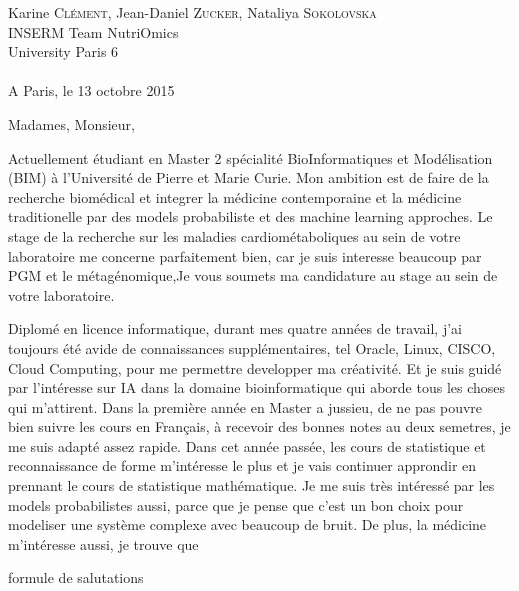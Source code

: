 \documentclass[11pt]{lettre}
\begin{document}
\begin{letter}{Karine \textsc{Clément}, Jean-Daniel \textsc{Zucker}, Nataliya \textsc{Sokolovska} \\ INSERM Team NutriOmics \\University Paris 6 \\ \\ A Paris, le 13 octobre 2015}
\address{\textsc{WANG} Jinxin\\ 82 Boulevard Saint Germain\\ 75005 Paris }

\def\concname{Object : } 

\opening{Madames, Monsieur,}

Actuellement étudiant en Master 2 spécialité BioInformatiques et Modélisation (BIM) à l'Université de Pierre et Marie Curie. 
Mon ambition est de faire de la recherche biomédical et integrer la médicine contemporaine et la médicine traditionelle par 
des models probabiliste et des machine learning approches. Le stage de la recherche sur les maladies cardiométaboliques au sein
de votre laboratoire me concerne parfaitement bien, car je suis interesse beaucoup par PGM et le métagénomique,Je vous soumets 
ma candidature au stage au sein de votre laboratoire.

Diplomé en licence informatique, durant mes quatre années de travail, j’ai toujours été avide de connaissances supplémentaires, tel Oracle, Linux, CISCO, Cloud Computing, pour me permettre developper ma créativité. Et je suis guidé par l'intéresse sur IA dans la domaine bioinformatique qui aborde tous les choses qui m'attirent. Dans la première année en Master a jussieu, de ne pas pouvre bien suivre les cours en Français, à recevoir des bonnes notes au deux semetres, je me suis adapté assez rapide. Dans cet année passée, les cours de statistique et reconnaissance de forme m'intéresse le plus et je vais continuer approndir en prennant le cours de statistique mathématique. Je me suis très intéressé par les models probabilistes aussi, parce que je pense que c'est un bon choix pour modeliser une système complexe avec beaucoup de bruit. De plus, la médicine m'intéresse aussi, je trouve que 

\closing{formule de salutations}

\end{letter}
\end{document}
